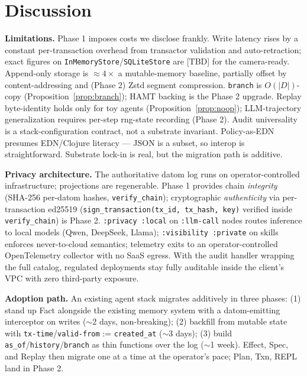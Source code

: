 \documentclass[anon]{nesy2026}   %
\newcommand{\C}[1]{\texttt{#1}}
\begin{document}
\section{Discussion}\label{sec:discussion}

\textbf{Limitations.} Phase 1 imposes costs we disclose frankly. Write latency rises by a constant per-transaction overhead from transactor validation and auto-retraction; exact figures on \C{InMemoryStore}/\C{SQLiteStore} are [TBD] for the camera-ready. Append-only storage is $\approx 4\times$ a mutable-memory baseline, partially offset by content-addressing and (Phase 2) Zstd segment compression. \C{branch} is $O(|D|)$-copy (Proposition~\ref{prop:branch}); HAMT backing is the Phase 2 upgrade. Replay byte-identity holds only for toy agents (Proposition~\ref{prop:noop}); LLM-trajectory generalization requires per-step rng-state recording (Phase 2). Audit universality is a stack-configuration contract, not a substrate invariant. Policy-as-EDN presumes EDN/Clojure literacy --- JSON is a subset, so interop is straightforward. Substrate lock-in is real, but the migration path is additive.

\textbf{Privacy architecture.} The authoritative datom log runs on operator-controlled infrastructure; projections are regenerable. Phase 1 provides chain \emph{integrity} (SHA-256 per-datom hashes, \C{verify\_chain}); cryptographic \emph{authenticity} via per-transaction ed25519 (\C{sign\_transaction(tx\_id, tx\_hash, key)} verified inside \C{verify\_chain}) is Phase 2. \C{:privacy :local} on \C{:llm-call} nodes routes inference to local models (Qwen, DeepSeek, Llama); \C{:visibility :private} on skills enforces never-to-cloud semantics; telemetry exits to an operator-controlled OpenTelemetry collector with no SaaS egress. With the audit handler wrapping the full catalog, regulated deployments stay fully auditable inside the client's VPC with zero third-party exposure.

\textbf{Adoption path.} An existing agent stack migrates additively in three phases: (1) stand up Fact alongside the existing memory system with a datom-emitting interceptor on writes ($\sim$2 days, non-breaking); (2) backfill from mutable state with \C{tx-time}/\C{valid-from} := \C{created\_at} ($\sim$3 days); (3) build \C{as\_of}/\C{history}/\C{branch} as thin functions over the log ($\sim$1 week). Effect, Spec, and Replay then migrate one at a time at the operator's pace; Plan, Txn, REPL land in Phase 2.
\end{document}
